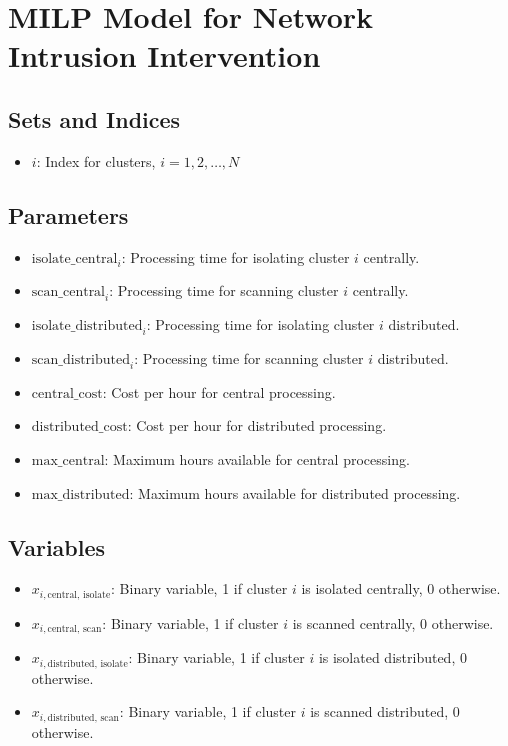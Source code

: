 \documentclass{article}
\begin{document}
\section*{MILP Model for Network Intrusion Intervention}

\subsection*{Sets and Indices}
\begin{itemize}
    \item \( i \): Index for clusters, \( i = 1, 2, \ldots, N \)
\end{itemize}

\subsection*{Parameters}
\begin{itemize}
    \item \( \text{isolate\_central}_i \): Processing time for isolating cluster \( i \) centrally.
    \item \( \text{scan\_central}_i \): Processing time for scanning cluster \( i \) centrally.
    \item \( \text{isolate\_distributed}_i \): Processing time for isolating cluster \( i \) distributed.
    \item \( \text{scan\_distributed}_i \): Processing time for scanning cluster \( i \) distributed.
    \item \( \text{central\_cost} \): Cost per hour for central processing.
    \item \( \text{distributed\_cost} \): Cost per hour for distributed processing.
    \item \( \text{max\_central} \): Maximum hours available for central processing.
    \item \( \text{max\_distributed} \): Maximum hours available for distributed processing.
\end{itemize}

\subsection*{Variables}
\begin{itemize}
    \item \( x_{i, \text{central, isolate}} \): Binary variable, 1 if cluster \( i \) is isolated centrally, 0 otherwise.
    \item \( x_{i, \text{central, scan}} \): Binary variable, 1 if cluster \( i \) is scanned centrally, 0 otherwise.
    \item \( x_{i, \text{distributed, isolate}} \): Binary variable, 1 if cluster \( i \) is isolated distributed, 0 otherwise.
    \item \( x_{i, \text{distributed, scan}} \): Binary variable, 1 if cluster \( i \) is scanned distributed, 0 otherwise.
\end{itemize}
\end{document}
